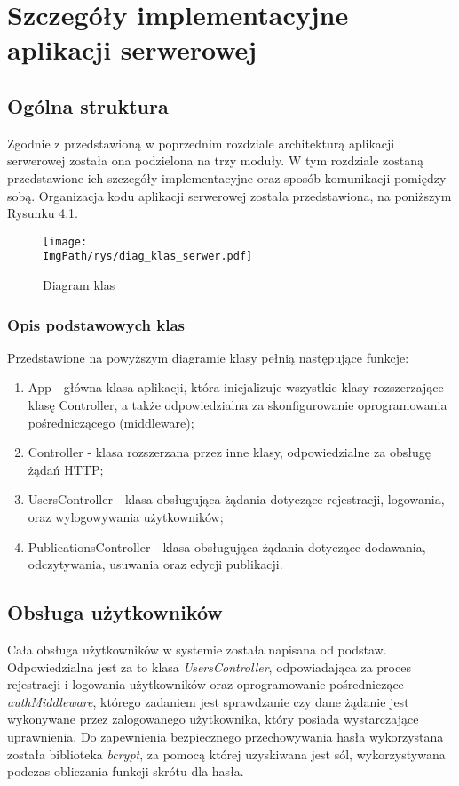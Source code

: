 \documentclass[a4paper,12pt,twoside,openany]{report}
\newcommand{\ImgPath}{.}
\begin{document}
\chapter{Szczegóły implementacyjne aplikacji serwerowej}
\section{Ogólna struktura}
Zgodnie z przedstawioną w poprzednim rozdziale architekturą aplikacji serwerowej została ona podzielona na trzy moduły. W tym rozdziale zostaną przedstawione ich szczegóły implementacyjne oraz sposób komunikacji pomiędzy sobą. Organizacja kodu aplikacji serwerowej została przedstawiona, na poniższym Rysunku 4.1.

 \begin{figure}[!htbp]
	\begin{center}
		\centering
		\texttt{[image: \\ImgPath/rys/diag\_klas\_serwer.pdf]}
	\end{center}
	\caption{Diagram klas}
	\label{diagramKlas}
\end{figure}
\subsection{Opis podstawowych klas}
Przedstawione na powyższym diagramie klasy pełnią następujące funkcje:
\begin{enumerate}
	\item App - główna klasa aplikacji, która inicjalizuje wszystkie klasy rozszerzające klasę Controller, a także odpowiedzialna za skonfigurowanie oprogramowania pośredniczącego (middleware);
	
	\item Controller - klasa rozszerzana przez inne klasy, odpowiedzialne za obsługę żądań  HTTP;
	
	\item UsersController - klasa obsługująca żądania dotyczące rejestracji, logowania, oraz wylogowywania użytkowników;
	
	\item PublicationsController - klasa obsługująca żądania dotyczące dodawania, odczytywania, usuwania oraz edycji publikacji.
	
\end{enumerate}

\section{Obsługa użytkowników}
Cała obsługa użytkowników w systemie została napisana od podstaw. Odpowiedzialna jest za to klasa \textit{UsersController}, odpowiadająca za proces rejestracji i logowania użytkowników oraz oprogramowanie pośredniczące \textit{authMiddleware}, którego zadaniem jest sprawdzanie czy dane żądanie jest wykonywane przez zalogowanego użytkownika, który posiada wystarczające uprawnienia. Do zapewnienia bezpiecznego przechowywania hasła wykorzystana została biblioteka \textit{bcrypt}, za pomocą której uzyskiwana jest sól, wykorzystywana podczas obliczania funkcji skrótu dla hasła. 
\end{document}
